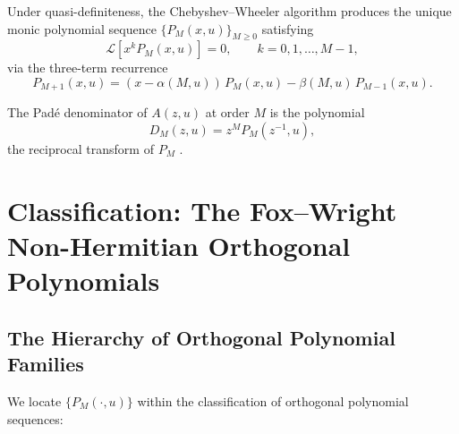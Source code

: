 \documentclass{article}
\begin{document}
Under quasi-definiteness, the Chebyshev--Wheeler algorithm
\cite{Wheeler1974,Gautschi1982} produces the unique monic polynomial
sequence $\{P_M(x,u)\}_{M\ge 0}$ satisfying
\begin{equation}\label{eq:orth_cond}
  \mathcal{L}[x^k P_M(x,u)] = 0, \qquad k = 0, 1, \dots, M-1,
\end{equation}
via the three-term recurrence
\begin{equation}\label{eq:three_term}
  P_{M+1}(x,u) = (x - \alpha(M,u))\,P_M(x,u) - \beta(M,u)\,P_{M-1}(x,u).
\end{equation}

The Padé denominator of $A(z,u)$ at order $M$ is the polynomial
\begin{equation}\label{eq:pade_denom}
  D_M(z,u) = z^M P_M(z^{-1},u),
\end{equation}
the reciprocal transform of $P_M$ \cite{Crowley2026,Gragg1972}.

\section{Classification: The Fox--Wright Non-Hermitian Orthogonal Polynomials}

\subsection{The Hierarchy of Orthogonal Polynomial Families}

We locate $\{P_M(\cdot, u)\}$ within the classification of orthogonal
polynomial sequences:
\end{document}
